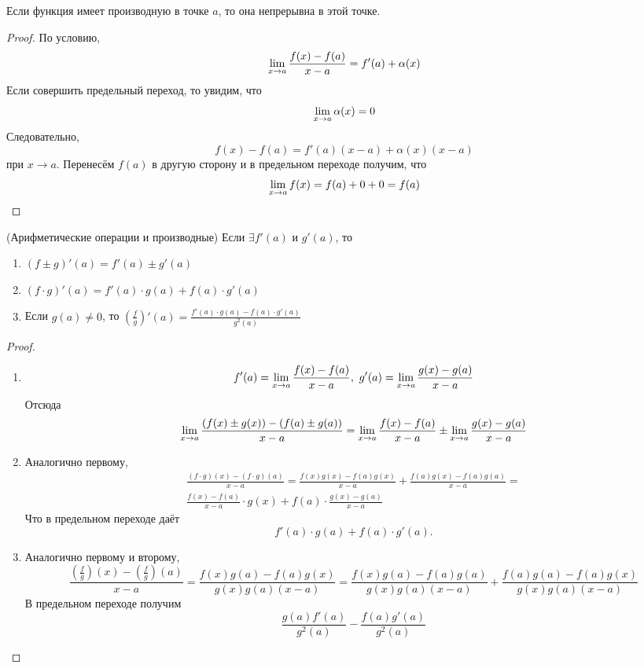 \begin{theorem}
	Если функция имеет производную в точке $a$, то она непрерывна в этой точке.
\end{theorem}

\begin{proof}
	По условию,
	$$
		\lim\limits_{x \to a} \frac{f(x) - f(a)}{x - a} = f'(a) + \alpha(x)
	$$
	Если совершить предельный переход, то увидим, что
	$$
		\lim\limits_{x \to a} \alpha(x) = 0
	$$
	Следовательно,
	$$
		f(x) - f(a) = f'(a)(x - a) + \alpha(x)(x - a)
	$$
	при $x \to a$. Перенесём $f(a)$ в другую сторону и в предельном переходе получим, что
	$$
		\lim\limits_{x \to a} f(x) = f(a) + 0 + 0 = f(a)
	$$
\end{proof}

\begin{theorem} (Арифметические операции и производные)
	Если $\exists f'(a)$ и $g'(a)$, то
	\begin{enumerate}
		\item $(f \pm g)'(a) = f'(a) \pm g'(a)$
		
		\item $(f \cdot g)'(a) = f'(a) \cdot g(a) + f(a) \cdot g'(a)$
		
		\item Если $g(a) \neq 0$, то $\left(\frac{f}{g}\right)'(a) = \frac{f'(a) \cdot g(a) - f(a) \cdot g'(a)}{g^2(a)}$
	\end{enumerate}
\end{theorem}

\begin{proof}
	\begin{enumerate}
		\item 
		$$
			f'(a) = \lim\limits_{x \to a} \frac{f(x) - f(a)}{x - a},\ g'(a) = \lim\limits_{x \to a} \frac{g(x) - g(a)}{x - a}
		$$
		Отсюда
		$$
			\lim\limits_{x \to a} \frac{(f(x) \pm g(x)) - (f(a) \pm g(a))}{x - a} = \lim\limits_{x \to a} \frac{f(x) - f(a)}{x - a} \pm \lim\limits_{x \to a} \frac{g(x) - g(a)}{x - a}
		$$
		
		\item Аналогично первому,
		\begin{multline*}
			\frac{(f \cdot g)(x) - (f \cdot g)(a)}{x - a} = \frac{f(x)g(x) - f(a)g(x)}{x - a} + \frac{f(a)g(x) - f(a)g(a)}{x - a} = \\
			\frac{f(x) - f(a)}{x - a} \cdot g(x) + f(a) \cdot \frac{g(x) - g(a)}{x - a}
		\end{multline*}
		Что в предельном переходе даёт
		$$
			f'(a) \cdot g(a) + f(a) \cdot g'(a).
		$$
		
		\item Аналогично первому и второму,
		$$
			\frac{(\frac{f}{g})(x) - (\frac{f}{g})(a)}{x - a} = \frac{f(x)g(a) - f(a)g(x)}{g(x)g(a)(x - a)} = \frac{f(x)g(a) - f(a)g(a)}{g(x)g(a)(x - a)} + \frac{f(a)g(a) - f(a)g(x)}{g(x)g(a)(x - a)}
		$$
		В предельном переходе получим
		$$
			\frac{g(a)f'(a)}{g^2(a)} - \frac{f(a)g'(a)}{g^2(a)}
		$$
	\end{enumerate}
\end{proof}

